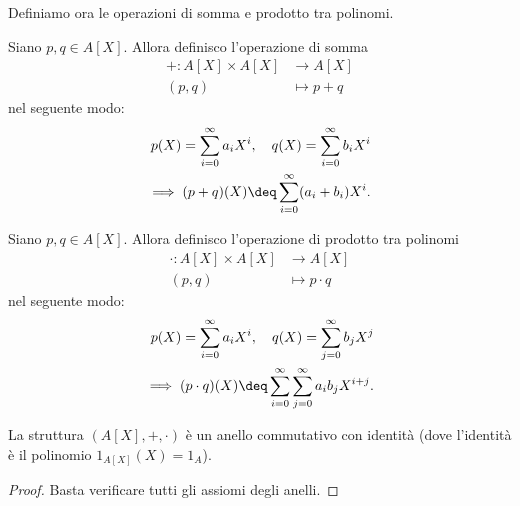 Definiamo ora le operazioni di somma e prodotto tra polinomi.

\begin{definition}
    Siano $p, q \in A[X]$.
    Allora definisco l'operazione di somma \begin{align*}
        + : A[X] \times A[X] &\to A[X]\\
        (p, q) &\mapsto p + q
    \end{align*} nel seguente modo: \begin{align*}
        p(X) = \sum_{i = 0}^\infty a_iX^i, \quad q(X) = \sum_{i = 0}^\infty b_iX^i\\
        \implies (p + q)(X) \deq \sum_{i = 0}^\infty (a_i + b_i)X^i.
    \end{align*}
\end{definition}

\begin{definition}
    Siano $p, q \in A[X]$.
    Allora definisco l'operazione di prodotto tra polinomi \begin{align*}
        \cdot : A[X] \times A[X] &\to A[X]\\
        (p, q) &\mapsto p \cdot q
    \end{align*} nel seguente modo: \begin{align*}
        p(X) = \sum_{i = 0}^\infty a_iX^i, \quad q(X) = \sum_{j = 0}^\infty b_jX^j \\
        \implies (p \cdot q)(X) \deq \sum_{i = 0}^\infty \sum_{j = 0}^\infty a_ib_jX^{i+j}.
    \end{align*}
\end{definition}

\begin{theorem}
    La struttura $(A[X], +, \cdot)$ è un anello commutativo con identità (dove l'identità è il polinomio $1_{A[X]}(X) = 1_A$).
\end{theorem}
\begin{proof}
    Basta verificare tutti gli assiomi degli anelli.
\end{proof}

